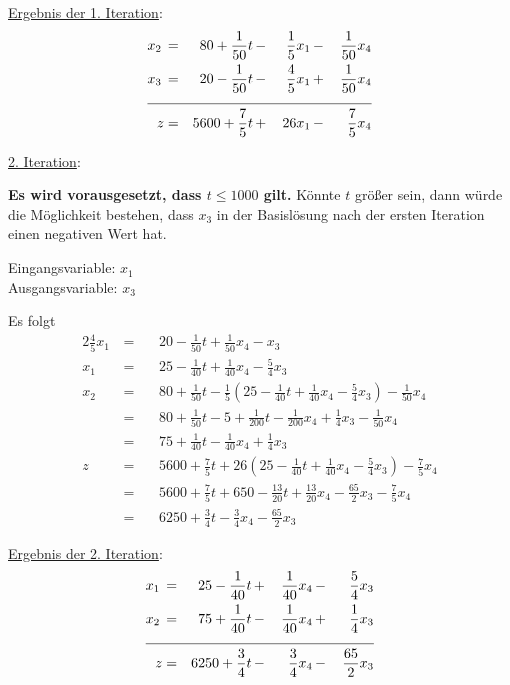 \documentclass[10pt,a4paper,oneside,ngerman,numbers=noenddot]{scrartcl}
\begin{document}
			\underline{Ergebnis der 1. Iteration}:
			\begin{alignat*}{4}
				x_{2} \,&=&\, 80 + \frac{1}{50}t \,&-&\, \frac{1}{5}x_{1} \,&-&\, \frac{1}{50}x_{4} \\
				x_{3} \,&=&\, 20 - \frac{1}{50}t \,&-&\, \frac{4}{5}x_{1} \,&+&\, \frac{1}{50}x_{4} \\ \cline{1 - 7}
				z &=& 5600 + \frac{7}{5}t \,&+&\, 26x_{1} \,&-&\, \frac{7}{5}x_{4}
			\end{alignat*}
			
			\underline{2. Iteration}:
			
			\textbf{Es wird vorausgesetzt, dass $t \leq 1000$ gilt.} Könnte $t$ größer sein, dann würde die Möglichkeit bestehen, dass $x_{3}$ in der Basislösung nach der ersten Iteration einen negativen Wert hat.
		
			Eingangsvariable: $x_{1}$\\
			Ausgangsvariable: $x_{3}$
		
			Es folgt
			\begin{alignat*}{2}
				\frac{4}{5}x_{1} \,&=&&\, 20 - \frac{1}{50}t +  \frac{1}{50}x_{4} - x_{3} \\
				x_{1} \,&=&&\, 25 - \frac{1}{40}t + \frac{1}{40}x_{4} - \frac{5}{4}x_{3} \\
				x_{2} \,&=&&\, 80 + \frac{1}{50}t - \frac{1}{5}\left(25 - \frac{1}{40}t + \frac{1}{40}x_{4} - \frac{5}{4}x_{3}\right) - \frac{1}{50}x_{4} \\
				&=&&\, 80 + \frac{1}{50}t - 5 + \frac{1}{200}t - \frac{1}{200}x_{4} + \frac{1}{4}x_{3} - \frac{1}{50}x_{4} \\
				&=&&\, 75 + \frac{1}{40}t - \frac{1}{40}x_{4} + \frac{1}{4}x_{3} \\
				z \,&=&&\, 5600 + \frac{7}{5}t + 26\left(25 - \frac{1}{40}t + \frac{1}{40}x_{4} - \frac{5}{4}x_{3}\right) - \frac{7}{5}x_{4} \\
				&=&&\, 5600 + \frac{7}{5}t + 650 - \frac{13}{20}t + \frac{13}{20}x_{4} - \frac{65}{2}x_{3} - \frac{7}{5}x_{4} \\
				&=&&\, 6250 + \frac{3}{4}t - \frac{3}{4}x_{4} - \frac{65}{2}x_{3}
			\end{alignat*}
		
			\underline{Ergebnis der 2. Iteration}:
			\begin{alignat*}{4}
				x_{1} \,&=&\, 25 - \frac{1}{40}t \,&+&\, \frac{1}{40}x_{4} \,&-&\, \frac{5}{4}x_{3} \\
				x_{2} \,&=&\, 75 + \frac{1}{40}t \,&-&\, \frac{1}{40}x_{4} \,&+&\, \frac{1}{4}x_{3} \\ \cline{1 - 7}
				z &=& 6250 + \frac{3}{4}t \,&-&\, \frac{3}{4}x_{4} \,&-&\, \frac{65}{2}x_{3}
			\end{alignat*}
			
\end{document}
